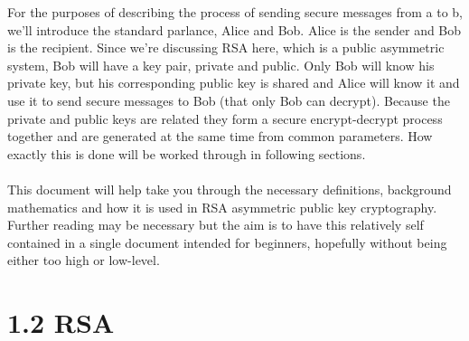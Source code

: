 \documentclass[11pt]{article}   	%
\begin{document}
For the purposes of describing the process of sending secure messages from a to b, we'll introduce the standard parlance, Alice and Bob. Alice is the sender and Bob is the recipient. Since we're discussing RSA here, which is a public asymmetric system, Bob will have a key pair, private and public. Only Bob will know his private key, but his corresponding public key is shared and Alice will know it and use it to send secure messages to Bob (that only Bob can decrypt). Because the private and public keys are related they form a secure encrypt-decrypt process together and are generated at the same time from common parameters. How exactly this is done will be worked through in following sections. \\
\\
This document will help take you through the necessary definitions, background mathematics and how it is used in RSA asymmetric public key cryptography. Further reading may be necessary but the aim is to have this relatively self contained in a single document intended for beginners, hopefully without being either too high or low-level.


\section*{1.2 RSA}
\end{document}

